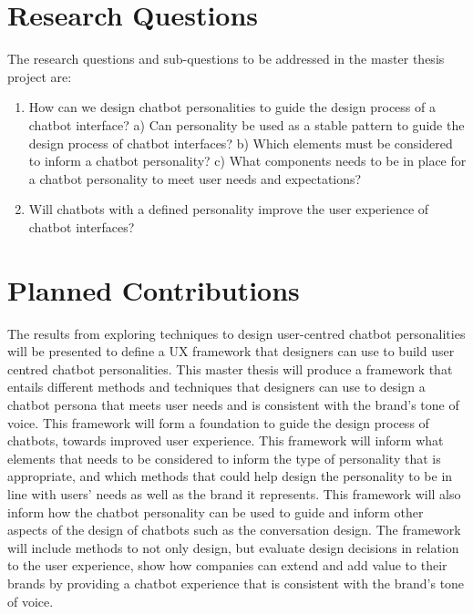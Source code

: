 \vspace{5mm} %

\section{Research Questions}

The research questions and sub-questions to be addressed in the master thesis project are:

\begin{enumerate}
    \item How can we design chatbot personalities to guide the design process of a chatbot interface? 
        \subitem a) Can personality be used as a stable pattern to guide the design \subitem    process of chatbot interfaces?
        \subitem b) Which elements must be considered to inform a chatbot personality?
        \subitem c) What components needs to be in place for a chatbot personality to \subitem  meet user needs and expectations?
    \item Will chatbots with a defined personality improve the user experience of chatbot interfaces?
\end{enumerate}

\vspace{5mm} %

\section{Planned Contributions}
The results from exploring techniques to design user-centred chatbot personalities will be presented to define a UX framework that designers can use to build user centred chatbot personalities. This master thesis will produce a framework that entails different methods and techniques that designers can use to design a chatbot persona that meets user needs and is consistent with the brand's tone of voice. This framework will form a foundation to guide the design process of chatbots, towards improved user experience. This framework will inform what elements that needs to be considered to inform the type of personality that is appropriate, and which methods that could help design the personality to be in line with users' needs as well as the brand it represents. This framework will also inform how the chatbot personality can be used to guide and inform other aspects of the design of chatbots such as the conversation design. The framework will include methods to not only design, but evaluate design decisions in relation to the user experience, show how companies can extend and add value to their brands by providing a chatbot experience that is consistent with the brand's tone of voice.